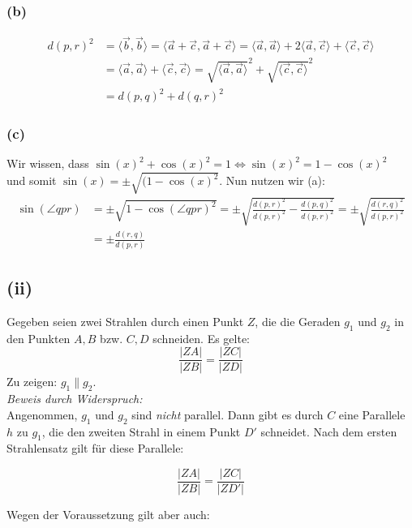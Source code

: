 \documentclass[12pt,a4paper]{article}
\begin{document}
\subsubsection*{(b)}
\begin{align*}
    d(p, r)^{2} &= \langle \vec{b}, \vec{b} \rangle = \langle \vec{a} + \vec{c}, \vec{a} + \vec{c} \rangle = \langle \vec{a}, \vec{a} \rangle + 2\langle \vec{a}, \vec{c} \rangle + \langle \vec{c}, \vec{c} \rangle \\
                &= \langle \vec{a}, \vec{a} \rangle + \langle \vec{c}, \vec{c} \rangle = \sqrt{\langle \vec{a}, \vec{a} \rangle}^{2}  + \sqrt{\langle \vec{c}, \vec{c} \rangle}^{2} \\
                &= d(p, q)^{2} + d(q, r)^{2}
\end{align*}

\subsubsection*{(c)}
Wir wissen, dass $\sin(x)^{2} + \cos(x)^2 = 1 \Leftrightarrow \sin(x)^{2} = 1 - \cos(x)^{2}$ \\
und somit $\sin(x) = \pm \sqrt{(1-\cos(x)^{2}}$. Nun nutzen wir (a):
\begin{align*}
    \sin(\angle qpr) &= \pm \sqrt{1-\cos(\angle qpr)^{2}} = \pm \sqrt{\frac{d(p, r)^{2}}{d(p, r)^{2}} - \frac{d(p, q)^{2}}{d(p, r)^{2}}} = \pm \sqrt{\frac{d(r, q)^{2}}{d(p, r)^{2}}} \\
                     &= \pm \frac{d(r, q)}{d(p, r)}
\end{align*}

\newpage
\subsection*{(ii)}
Gegeben seien zwei Strahlen durch einen Punkt $Z$, die die Geraden $g_1$ und $g_2$ in den Punkten $A, B$ bzw. $C, D$ schneiden. Es gelte: 
\[ 
    \frac{|ZA|}{|ZB|} = \frac{|ZC|}{|ZD|} 
\]
\noindent Zu zeigen: $g_1 \parallel g_2$.\\
\noindent \textit{Beweis durch Widerspruch:}\\ 
 Angenommen, $g_1$ und $g_2$ sind \emph{nicht} parallel. 
 Dann gibt es durch $C$ eine Parallele $h$ zu $g_1$, die den zweiten Strahl in einem Punkt $D'$ schneidet. Nach dem ersten Strahlensatz gilt für diese Parallele: 

\[ 
    \frac{|ZA|}{|ZB|} = \frac{|ZC|}{|ZD'|} 
\] 

\noindent Wegen der Voraussetzung gilt aber auch: 
\end{document}
